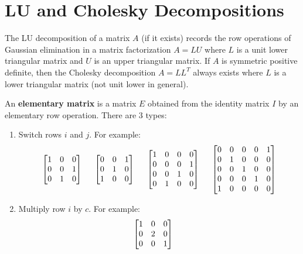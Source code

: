 \section{LU and Cholesky Decompositions}

\begin{bigidea}
The LU decomposition of a matrix $A$ (if it exists) records the row operations of Gaussian elimination in a matrix factorization $A=LU$ where $L$ is a unit lower triangular matrix and $U$ is an upper triangular matrix. If $A$ is symmetric positive definite, then the Cholesky decomposition $A = LL^T$ always exists where $L$ is a lower triangular matrix (not unit lower in general).
\end{bigidea}

\begin{definition}
An {\bf elementary matrix} \cite[p.95]{KN} is a matrix $E$ obtained from the identity matrix $I$ by an elementary row operation. There are 3 types:
\begin{enumerate}
\item Switch rows $i$ and $j$. For example:
$$
\begin{bmatrix} 1 & 0 & 0 \\ 0 & 0 & 1 \\ 0 & 1 & 0 \end{bmatrix} \hspace{5mm}
\begin{bmatrix} 0 & 0 & 1 \\ 0 & 1 & 0 \\ 1 & 0 & 0 \end{bmatrix} \hspace{5mm}
\begin{bmatrix} 1 & 0 & 0 & 0 \\ 0 & 0 & 0 & 1 \\ 0 & 0 & 1 & 0 \\ 0 & 1 & 0 & 0 \end{bmatrix} \hspace{5mm}
\begin{bmatrix} 0 & 0 & 0 & 0 & 1 \\ 0 & 1 & 0 & 0 & 0 \\ 0 & 0 & 1 & 0 & 0 \\ 0 & 0 & 0 & 1 & 0 \\ 1 & 0 & 0 & 0 & 0 \end{bmatrix}
$$
\item Multiply row $i$ by $c$. For example:
$$
\begin{bmatrix} 1 & 0 & 0 \\ 0 & 2 & 0 \\ 0 & 0 & 1 \end{bmatrix} \hspace{5mm}
$$
\end{enumerate}
\end{definition}
